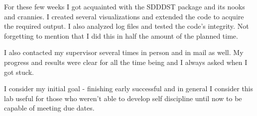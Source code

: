 \documentclass[12pt,a4paper]{article}
\theoremstyle{plain}
\begin{document}
\begin{multicols*}{2}
	\par For these few weeks I got acquainted with the SDDDST package and its nooks and crannies.
	I created several visualizations and extended the code to acquire the required
	output. I also analyzed log files and tested the code's integrity. Not forgetting to mention
	that I did this in half the amount of the planned time.

	\par I also contacted my supervisor several times in person and in mail as well. My progress
	and results were clear for all the time being and I always asked when I got stuck.

	\par I consider my initial goal - finishing early successful and in general I consider this
	lab useful for those who weren't able to develop self discipline until now to
	be capable of meeting due dates.

	

	

\end{multicols*}
\end{document}
